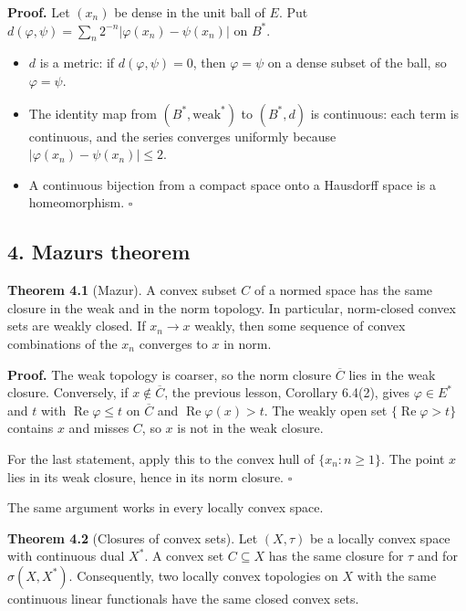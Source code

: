 \documentclass[
  english,
  11pt,
  a4paper,
]{article}
\providecommand{\tightlist}{%
  \setlength{\itemsep}{0pt}\setlength{\parskip}{0pt}}
\begin{document}
\textbf{Proof.} Let \((x_n)\) be dense in the unit ball of \(E\). Put
\(d(\varphi,\psi)=\sum_n2^{-n}|\varphi(x_n)-\psi(x_n)|\) on \(B^*\).

\begin{itemize}
\tightlist
\item
  \(d\) is a metric: if \(d(\varphi,\psi)=0\), then \(\varphi=\psi\) on
  a dense subset of the ball, so \(\varphi=\psi\).
\item
  The identity map from \((B^*,\text{weak}^*)\) to \((B^*,d)\) is
  continuous: each term is continuous, and the series converges
  uniformly because \(|\varphi(x_n)-\psi(x_n)|\le2\).
\item
  A continuous bijection from a compact space onto a Hausdorff space is
  a homeomorphism. \(\square\)
\end{itemize}

\subsection[4. Mazur\textquotesingle s
theorem]{\texorpdfstring{\protect\hypertarget{weak-topologies-tychonoff-banach-alaoglu-mazur-bipolars-krein-milman-and-eberlein-smulian--oa-fnd-wt-04}{}{}4.
Mazur\textquotesingle s
theorem}{4. Mazur\textquotesingle s theorem}}\label{weak-topologies-tychonoff-banach-alaoglu-mazur-bipolars-krein-milman-and-eberlein-smulian--OA-FND-WT-04}

\textbf{Theorem 4.1} (Mazur). A convex subset \(C\) of a normed space
has the same closure in the weak and in the norm topology. In
particular, norm-closed convex sets are weakly closed. If \(x_n\to x\)
weakly, then some sequence of convex combinations of the \(x_n\)
converges to \(x\) in norm.

\textbf{Proof.} The weak topology is coarser, so the norm closure
\(\overline C\) lies in the weak closure. Conversely, if
\(x\notin\overline C\), the previous lesson, Corollary 6.4(2), gives
\(\varphi\in E^*\) and \(t\) with \(\operatorname{Re}\varphi\le t\) on
\(\overline C\) and \(\operatorname{Re}\varphi(x)>t\). The weakly open
set \(\{\operatorname{Re}\varphi>t\}\) contains \(x\) and misses \(C\),
so \(x\) is not in the weak closure.

For the last statement, apply this to the convex hull of
\(\{x_n:n\ge1\}\). The point \(x\) lies in its weak closure, hence in
its norm closure. \(\square\)

The same argument works in every locally convex space.

\textbf{Theorem 4.2} (Closures of convex sets). Let \((X,\tau)\) be a
locally convex space with continuous dual \(X^*\). A convex set
\(C\subseteq X\) has the same closure for \(\tau\) and for
\(\sigma(X,X^*)\). Consequently, two locally convex topologies on \(X\)
with the same continuous linear functionals have the same closed convex
sets.
\end{document}
